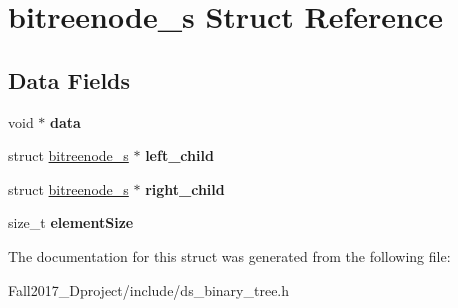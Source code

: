 \hypertarget{structbitreenode__s}{}\section{bitreenode\+\_\+s Struct Reference}
\label{structbitreenode__s}
\subsection*{Data Fields}
\begin{DoxyCompactItemize}
\item 
\mbox{\label{structbitreenode__s_a735984d41155bc1032e09bece8f8d66d}} 
void $\ast$ {\bfseries data}
\item 
\mbox{\label{structbitreenode__s_aca9af0f3ba369b6aff616640a0b842aa}} 
struct \hyperlink{structbitreenode__s}{bitreenode\+\_\+s} $\ast$ {\bfseries left\+\_\+child}
\item 
\mbox{\label{structbitreenode__s_a27d28175093bd9993fc8ad15496114c0}} 
struct \hyperlink{structbitreenode__s}{bitreenode\+\_\+s} $\ast$ {\bfseries right\+\_\+child}
\item 
\mbox{\label{structbitreenode__s_af884332e6713af9425451adde09e0024}} 
size\+\_\+t {\bfseries element\+Size}
\end{DoxyCompactItemize}


The documentation for this struct was generated from the following file\+:\begin{DoxyCompactItemize}
\item 
Fall2017\+\_\+Dproject/include/ds\+\_\+binary\+\_\+tree.\+h\end{DoxyCompactItemize}
